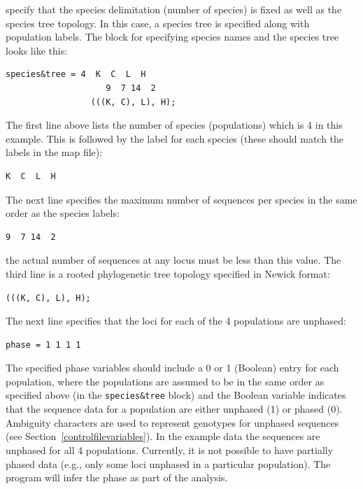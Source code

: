 \documentclass{book}
\numberwithin{equation}{section} \renewcommand{\baselinestretch}{0.55}
\begin{document}
specify that the species delimitation (number of species) is fixed as
well as the species tree topology. In this case,
a species tree is specified along with population labels.
The block for specifying species names
and the species tree looks like this:
{\small
\begin{verbatim}
species&tree = 4  K  C  L  H
                    9  7 14  2
                 (((K, C), L), H);
\end{verbatim}
}
\noindent
The first line above lists the number of species (populations) which is
4 in this example. This is followed
by the label for each species (these should match the labels in the map
file):
\begin{verbatim}
K  C  L  H
\end{verbatim}
The next line specifies the maximum number of sequences per
species in the same order as the species labels:
\begin{verbatim}
9  7 14  2
\end{verbatim}
the actual number of sequences at any locus must be less than this value.
The third line is a rooted phylogenetic tree topology specified in
Newick format:
\begin{verbatim}
(((K, C), L), H);
\end{verbatim}
The next line specifies that the loci for each of the 4 populations
are unphased:
\begin{verbatim}
phase = 1 1 1 1
\end{verbatim}
The specified phase variables should include a 0 or 1 (Boolean) entry for each population, 
where the populations are assumed to be in the same order as specified above
(in the \texttt{species\&tree} block)
and the Boolean variable indicates that the sequence data for a population
are either unphased (1) or phased (0). Ambiguity characters are used to represent
genotypes for unphased sequences (see Section~\ref{controlfilevariables}).
In the example data the sequences are unphased for all 4 populations.
Currently, it is not possible to have partially phased data (e.g., only
some loci unphased in a particular population). The program will infer
the phase as part of the analysis.
\end{document}
